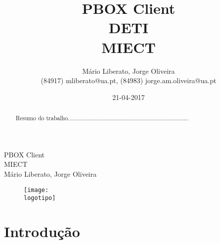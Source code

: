 \documentclass{report}
\begin{document}
%
%
\def\titulo{PBOX Client}
\def\data{21-04-2017}
\def\autores{Mário Liberato, Jorge Oliveira}
\def\autorescontactos{(84917) mliberato@ua.pt, (84983) jorge.am.oliveira@ua.pt}
\def\departamento{DETI}
\def\curso{MIECT}
\def\logotipo{ua.pdf}
%
%
\begin{titlepage}

\begin{center}
%
\vspace*{50mm}
%
{\Huge \titulo}\\ 
%
\vspace{10mm}
%
{\Large \curso}\\
%
\vspace{10mm}
%
{\LARGE \autores}\\ 
%
\vspace{30mm}
%
\begin{figure}[h]
\center
\texttt{[image: \\logotipo]}
\end{figure}
%
\vspace{30mm}
\end{center}
%
\end{titlepage}

\title{%
{\Huge\textbf{\titulo}}\\
{\Large \departamento\\ \curso}
}
%
\author{%
    \autores \\
    \autorescontactos
}
%
\date{\data}
%
\maketitle


\begin{abstract}
Resumo do trabalho..........................................................................
\end{abstract}


\tableofcontents


%
\clearpage
{} %
%
\chapter{Introdução}
\label{chap.introducao} %
\end{document}
